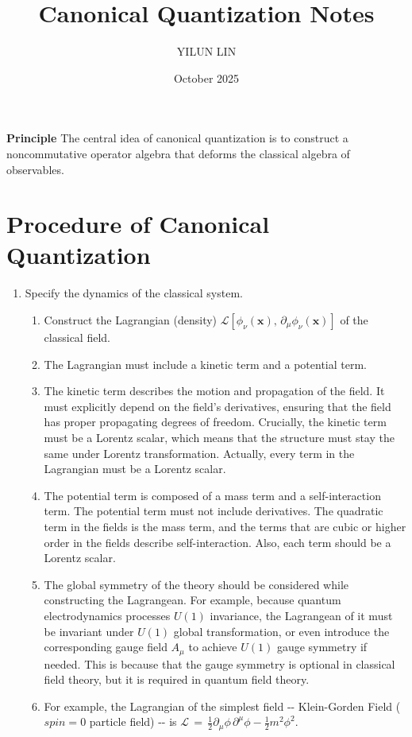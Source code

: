 \documentclass[11pt]{article}
\title{Canonical Quantization Notes}
\author{YILUN LIN}
\date{October 2025}
\numberwithin{equation}{section}
\begin{document}
\maketitle
\Large\textbf{Principle}
\newline
\Large{The central idea of canonical quantization is to construct a noncommutative operator algebra that deforms the classical algebra of observables.}
\section{Procedure of Canonical Quantization}
\begin{enumerate}
    \item Specify the dynamics of the classical system.
    \begin{enumerate}
        \item Construct the Lagrangian (density) $\mathcal{L}\left[\phi_{\nu}\left(\mathbf{x}\right),\,\partial_{\mu}\phi_{\nu}\left(\mathbf{x}\right)\right]$ of the classical field.
        \item The Lagrangian must include a kinetic term and a potential term. 
        \item The kinetic term describes the motion and propagation of the field. It must explicitly depend on the field's derivatives, ensuring that the field has proper propagating degrees of freedom. Crucially, the kinetic term must be a Lorentz scalar, which means that the structure must stay the same under Lorentz transformation. Actually, every term in the Lagrangian must be a Lorentz scalar. 
        \item The potential term is composed of a mass term and a self-interaction term. The potential term must not include derivatives. The quadratic term in the fields is the mass term, and the terms that are cubic or higher order in the fields describe self-interaction. Also, each term should be a Lorentz scalar. 
        \item The global symmetry of the theory should be considered while constructing the Lagrangean. For example, because quantum electrodynamics processes $U\left(1\right)$ invariance, the Lagrangean of it must be invariant under $U\left(1\right)$ global transformation, or even introduce the corresponding gauge field $A_{\mu}$ to achieve $U\left(1\right)$ gauge symmetry if needed. This is because that the gauge symmetry is optional in classical field theory, but it is required in quantum field theory. 
        \item For example, the Lagrangian of the simplest field \--\-- Klein-Gorden Field ($spin=0$ particle field) \--\-- is $\mathcal{L}\,=\,\frac{1}{2}\partial_{\mu}\phi\,\partial^{\mu}\phi-\frac{1}{2}m^{2}\phi^{2}$.

\end{enumerate}
\end{enumerate}
\end{document}
